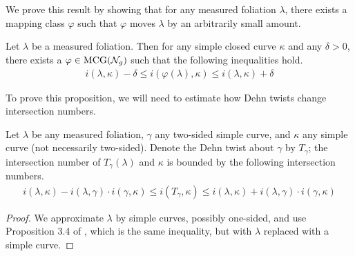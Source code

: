 \documentclass[12pt, reqno]{amsart}
\begin{document}
We prove this result by showing that for any measured foliation $\lambda$, there exists a mapping class $\varphi$ such that $\varphi$ moves $\lambda$ by an arbitrarily small amount.
\begin{proposition}
  \label{prop:mapping-class-estimate}
  Let $\lambda$ be a measured foliation.
  Then for any simple closed curve $\kappa$ and any $\delta > 0$, there exists a $\varphi \in \mathrm{MCG}(\mathcal{N}_g)$ such that the following inequalities hold.
  \begin{align*}
    i(\lambda , \kappa) - \delta
    \leq i(\varphi(\lambda), \kappa)
    \leq i(\lambda , \kappa) + \delta
  \end{align*}
\end{proposition}
To prove this proposition, we will need to estimate how Dehn twists change intersection numbers.
\begin{lemma}
  \label{lem:dehn-twist-estimate}
  Let $\lambda$ be any measured foliation, $\gamma$ any two-sided simple curve, and $\kappa$ any simple curve (not necessarily two-sided).
  Denote the Dehn twist about $\gamma$ by $T_{\gamma}$; the intersection number of $T_\gamma(\lambda)$ and $\kappa$ is bounded by the following intersection numbers.
  \begin{align*}
    i(\lambda, \kappa) - i(\lambda, \gamma) \cdot i(\gamma, \kappa)
    \leq i(T_{\gamma}, \kappa)
    \leq i(\lambda, \kappa) + i(\lambda, \gamma) \cdot i(\gamma, \kappa)
  \end{align*}
\end{lemma}
\begin{proof}
  We approximate $\lambda$ by simple curves, possibly one-sided, and use Proposition 3.4 of \cite{farb2011primer}, which is the same inequality, but with $\lambda$ replaced with a simple curve.
\end{proof}
\end{document}
